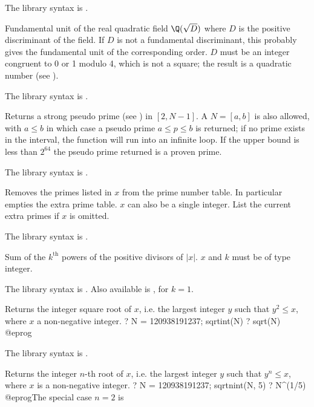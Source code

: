 The library syntax is .

\label{se:quadunit}
Fundamental unit of the
real quadratic field $\Q(\sqrt D)$ where  $D$ is the positive discriminant
of the field. If $D$ is not a fundamental discriminant, this probably gives
the fundamental unit of the corresponding order. $D$ must be an integer
congruent to 0 or 1 modulo 4, which is not a square; the result is a
quadratic number (see ).

The library syntax is .

\label{se:randomprime}
Returns a strong pseudo prime (see ) in $[2,N-1]$.
A  $N = [a,b]$ is also allowed, with $a \leq b$ in which case a
pseudo prime $a \leq p \leq b$ is returned; if no prime exists in the
interval, the function will run into an infinite loop. If the upper bound
is less than $2^{64}$ the pseudo prime returned is a proven prime.

The library syntax is .

\label{se:removeprimes}
Removes the primes listed in $x$ from
the prime number table. In particular  empties
the extra prime table. $x$ can also be a single integer. List the current
extra primes if $x$ is omitted.

The library syntax is .

\label{se:sigma}
Sum of the $k^{\text{th}}$ powers of the positive divisors of $|x|$. $x$
and $k$ must be of type integer.

The library syntax is .
Also available is , for $k = 1$.

\label{se:sqrtint}
Returns the integer square root of $x$, i.e. the largest integer $y$
such that $y^2 \leq x$, where $x$ a non-negative integer.
\bprog
? N = 120938191237; sqrtint(N)
? sqrt(N)
@eprog

The library syntax is .

\label{se:sqrtnint}
Returns the integer $n$-th root of $x$, i.e. the largest integer $y$ such
that $y^n \leq x$, where $x$ is a non-negative integer.
\bprog
? N = 120938191237; sqrtnint(N, 5)
? N^(1/5)
@eprog\noindent The special case $n = 2$ is 

